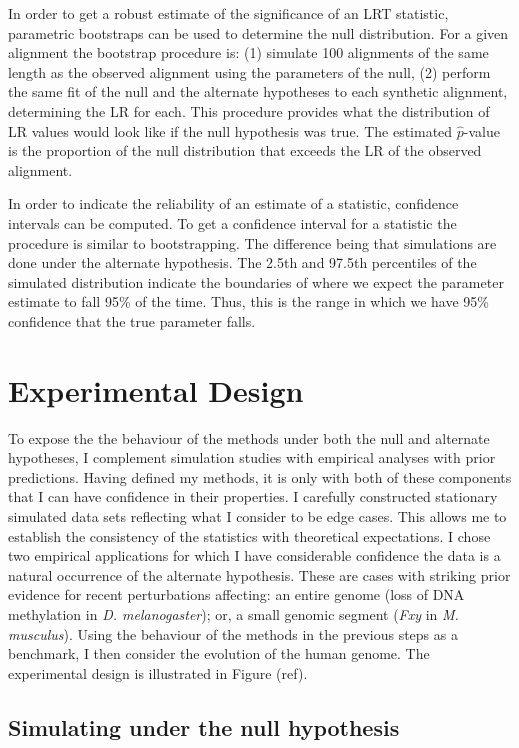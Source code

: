 In order to get a robust estimate of the significance of an LRT statistic, parametric bootstraps can be used to determine the null distribution. For a given alignment the bootstrap procedure is: 
(1) simulate 100 alignments of the same length as the observed alignment using the parameters of the null, 
(2) perform the same fit of the null and the alternate hypotheses to each synthetic alignment, determining the LR for each.  
This procedure provides what the distribution of LR values would look like if the null hypothesis was true. The estimated $\hat p$-value is the proportion of the null distribution that exceeds the LR of the observed alignment. 

In order to indicate the reliability of an estimate of a statistic, confidence intervals can be computed. To get a confidence interval for a statistic the procedure is similar to bootstrapping. The difference being that simulations are done under the alternate hypothesis. The 2.5th and 97.5th percentiles of the simulated distribution indicate the boundaries of where we expect the parameter estimate to fall 95\% of the time. Thus, this is the range in which we have 95\% confidence that the true parameter falls. 

\section{Experimental Design}

To expose the the behaviour of the methods under both the null and alternate hypotheses, I complement  simulation studies with empirical analyses with prior predictions. Having defined my methods, it is only with both of these components that I can have confidence in their properties. I carefully constructed stationary simulated data sets reflecting what I consider to be edge cases. This allows me to establish the consistency of the statistics with theoretical expectations. I chose two empirical applications for which I have considerable confidence the data is a natural occurrence of the alternate hypothesis. These are cases with striking prior evidence for recent perturbations affecting: an entire genome (loss of DNA methylation in \textit{D. melanogaster}); or, a small genomic segment (\textit{Fxy} in \textit{M. musculus}). Using the behaviour of the methods in the previous steps as a benchmark, I then consider the evolution of the human genome. The experimental design is illustrated in Figure (ref). 

\subsection{Simulating under the null hypothesis}

